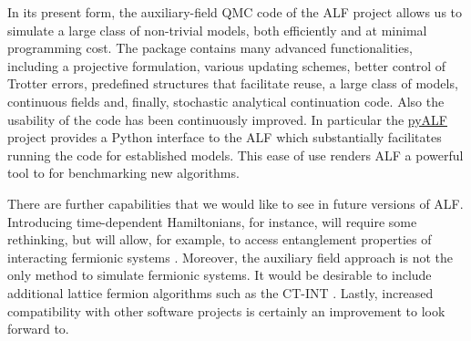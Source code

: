 
In its present form, the  auxiliary-field QMC code of the ALF project allows us to simulate a large class of non-trivial models, both efficiently and at minimal  programming cost. The package contains many advanced functionalities, including a projective formulation, various updating schemes, better control of Trotter errors, predefined structures that facilitate reuse, a large class of models, continuous fields and, finally, stochastic analytical continuation code. Also the usability of the code has been continuously improved. In particular the \href{https://git.physik.uni-wuerzburg.de/ALF/pyALF/-/tree/\pyALFbranch}{pyALF} project provides a Python interface to the ALF which substantially facilitates running the code for established models.  This ease of use renders ALF a powerful tool to for benchmarking new algorithms. 

There are further capabilities that we would like to see in future versions of ALF. Introducing time-dependent Hamiltonians, for instance, will require some rethinking, but will allow, for example, to access entanglement properties of interacting fermionic systems \cite{Broecker14,Assaad13a,Assaad15}. Moreover, the auxiliary field approach is not the only method to simulate fermionic systems. 
It would be desirable to include additional lattice fermion algorithms such as the CT-INT \cite{Rubtsov05,Assaad07}.
Lastly, increased compatibility with other software projects is certainly an improvement to look forward to. 
